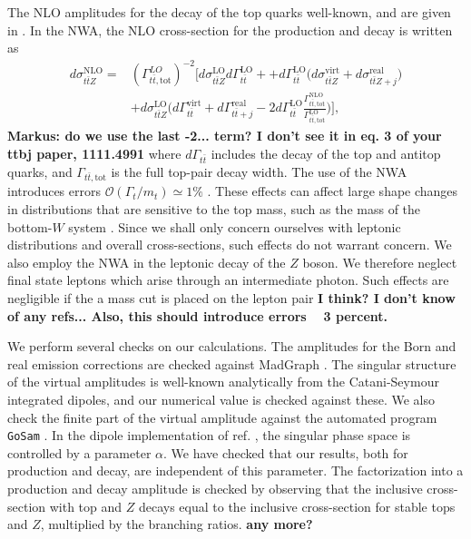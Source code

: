 \documentclass[preprint]{JHEP3} %
\newcommand{\mrm}{\mathrm}
\def\ttbZ{t\bar{t}Z}
\def\ttb{t\bar{t}}
\begin{document}
The NLO amplitudes for the decay of the top quarks well-known, and are given in \cite{Jezabek:1988iv,Czarnecki:1990pe,Czarnecki:1990kv,Li:1990qf,Campbell:2004ch,}. In the NWA, the NLO cross-section for the production and decay is written as \cite{Campbell:2004ch,Melnikov:2009dn}
\begin{equation}
\begin{split}
d \sigma_{\ttbZ}^{\mrm{NLO}} =& (\Gamma_{\ttb,\mrm{tot}}^{LO})^{-2} \biggl[ d \sigma_{\ttbZ}^{\mrm{LO}} d\Gamma_{\ttb}^{\mrm{LO}} +  + d\Gamma_{\ttb}^{\mrm{LO}} \bigl( d\sigma_{\ttbZ}^{\mrm{virt}} +d\sigma_{\ttbZ+j}^{\mrm{real}} \bigr) \\ 
& + d \sigma_{\ttbZ}^{\mrm{LO}} \biggl(d\Gamma_{\ttb}^{\mrm{virt}}+d\Gamma_{\ttb+j}^{\mrm{real}}  - 2d\Gamma_{\ttb}^{\mrm{LO}} \frac{\Gamma_{\ttb,\mrm{tot}}^{\mrm{NLO}}}{ \Gamma_{\ttb,\mrm{tot}}^{\mrm{LO}}} \biggr) \biggr],
\end{split}
\end{equation}
{\bf Markus: do we use the last -2... term? I don't see it in eq. 3 of your ttbj paper, 1111.4991}
where $d\Gamma_{\ttb}$ includes the decay of the top and antitop quarks, and $\Gamma_{\ttb,\mrm{tot}}$ is the full top-pair decay width. The use of the NWA introduces errors $\mathcal{O}(\Gamma_t / m_t) \simeq 1\%$ \cite{AlcarazMaestre:2012vp}. These effects can affect large shape changes in distributions that are sensitive to the top mass, such as the mass of the bottom-$W$ system \cite{AlcarazMaestre:2012vp,Papanastasiou:2013dta}. Since we shall only concern ourselves with leptonic distributions and overall cross-sections, such effects do not warrant concern. We also employ the NWA in the leptonic decay of the $Z$ boson. We therefore neglect final state leptons which arise through an intermediate photon. Such effects are negligible if the a mass cut is placed on the lepton pair {\bf I think? I don't know of any refs... Also, this should introduce errors ~ 3 percent.}

We perform several checks on our calculations. The amplitudes for the Born and real emission corrections are checked against MadGraph \cite{Alwall:2011uj}. The singular structure of the virtual amplitudes is well-known analytically from the Catani-Seymour integrated dipoles, and our numerical value is checked against these. We also check the finite part of the virtual amplitude against the automated program {\tt GoSam} \cite{Cullen:2011ac}. In the dipole implementation of ref. \cite{Nagy:2003tz,Nagy:2003tz}, the singular phase space is controlled by a parameter $\alpha$. We have checked that our results, both for production and decay, are independent of this parameter. The factorization into a production and decay amplitude is checked by observing that the inclusive cross-section with top and $Z$ decays equal to the inclusive cross-section for stable tops and $Z$, multiplied by the branching ratios. {\bf any more?}
\end{document}
